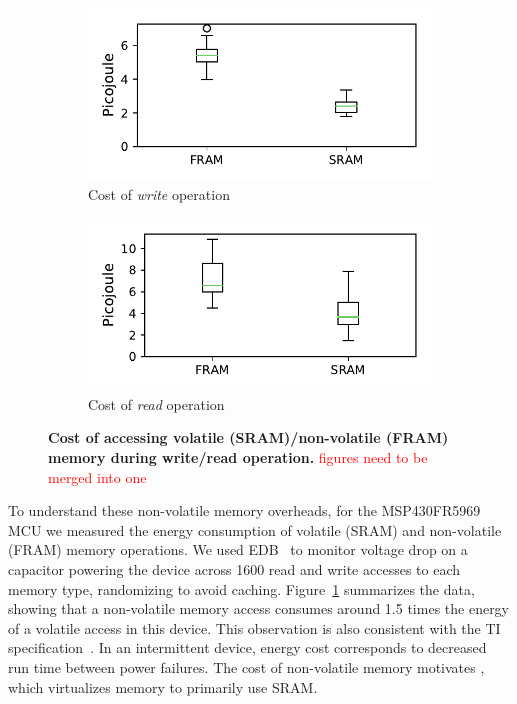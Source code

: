 \begin{figure}
\begin{subfigure}[t]{.49\columnwidth}
	\centering \includegraphics[width=\columnwidth]{figures/fram_write}
	\caption{Cost of \emph{write} operation}
\end{subfigure}%
\begin{subfigure}[t]{.49\columnwidth}
	\centering \includegraphics[width=\columnwidth]{figures/fram_read}
	\caption{Cost of \emph{read} operation}
\end{subfigure}
	\caption{\textbf{Cost of accessing volatile (SRAM)/non-volatile (FRAM) memory during write/read operation.} \textcolor{red}{figures need to be merged into one}}\label{fig:framEnergy}
\end{figure}

To understand these non-volatile memory overheads, for the MSP430FR5969~\cite{msp430datasheet} MCU we measured the energy consumption of volatile (SRAM) and non-volatile (FRAM) memory operations. We used EDB~\cite{edb} to monitor voltage drop on a capacitor powering the device across 1600 read and write accesses to each memory type, randomizing to avoid caching. Figure~\ref{fig:framEnergy} summarizes the data, showing that a non-volatile memory access consumes around 1.5 times the energy of a volatile access in this device. This observation is also consistent with the TI specification~\cite{}.  In an intermittent device, energy cost corresponds to decreased run time between power failures. The cost of non-volatile memory motivates \sys, which virtualizes memory to primarily use SRAM.

